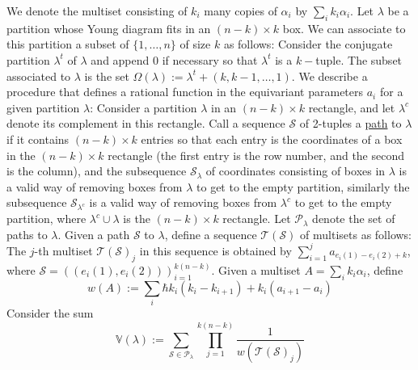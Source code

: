 \documentclass[12 pt]{article}
\theoremstyle{plain}
\theoremstyle{plain}
\theoremstyle{plain}
\theoremstyle{plain}
\theoremstyle{plain}
\theoremstyle{plain}
\theoremstyle{plain}
\theoremstyle{plain}
\theoremstyle{plain}
\theoremstyle{plain}
\theoremstyle{remark}
\theoremstyle{remark}
\theoremstyle{definition}
\theoremstyle{definition}
\theoremstyle{definition}
\theoremstyle{definition}
\theoremstyle{definition}
\theoremstyle{definition}
\begin{document}
We denote the multiset consisting of $k_{i}$ many copies of $\alpha_{i}$ by $\sum_{i}k_{i}\alpha_{i}$. Let $\lambda$ be a partition whose Young diagram fits in an $(n-k)\times k$ box. We can associate to this partition a subset of $\{1,\dots,n\}$ of size $k$ as follows: Consider the conjugate partition $\lambda^{t}$ of $\lambda$ and append 0 if necessary so that $\lambda^{t}$ is a $k-$tuple. The subset associated to $\lambda$ is the set $\Omega(\lambda):=\lambda^{t}+(k,k-1,\dots,1)$. We describe a procedure that defines a rational function in the equivariant parameters $a_{i}$ for a given partition $\lambda$:\newline\newline
Consider a partition $\lambda$ in an $(n-k)\times k$ rectangle, and let $\lambda^{c}$ denote its complement in this rectangle. Call a sequence $\mathcal{S}$ of 2-tuples a \underline{path} to $\lambda$ if it contains $(n-k)\times k$ entries so that each entry is the coordinates of a box in the $(n-k)\times k$ rectangle (the first entry is the row number, and the second is the column), and the subsequence $\mathcal{S}_{\lambda}$ of coordinates consisting of boxes in $\lambda$ is a valid way of removing boxes from $\lambda$ to get to the empty partition, similarly the subsequence $\mathcal{S}_{\lambda^{c}}$ is a valid way of removing boxes from $\lambda^{c}$ to get to the empty partition, where $\lambda^{c}\cup\lambda$ is the $(n-k)\times k$ rectangle. Let $\mathcal{P}_{\lambda}$ denote the set of paths to $\lambda$. Given a path $\mathcal{S}$ to $\lambda$, define a sequence $\mathcal{T}(\mathcal{S})$ of multisets as follows: The $j$-th multiset $\mathcal{T}(\mathcal{S})_{j}$ in this sequence is obtained by $\sum\limits_{i=1}^{j}a_{e_{i}(1)-e_{i}(2)+k}$, where $\mathcal{S}=((e_{i}(1),e_{i}(2)))_{i=1}^{k(n-k)}$. Given a multiset $A=\sum_{i}k_{i}\alpha_{i}$, define
\[w(A):=\sum_{i}\hbar k_{i}(k_{i}-k_{i+1})+k_{i}(a_{i+1}-a_{i})\]
Consider the sum 
\[\mathbb{V}(\lambda):=\sum\limits_{\mathcal{S}\in\mathcal{P}_{\lambda}}\prod\limits_{j=1}^{k(n-k)}\frac{1}{w(\mathcal{T}(\mathcal{S})_{j})}\]
\end{document}
